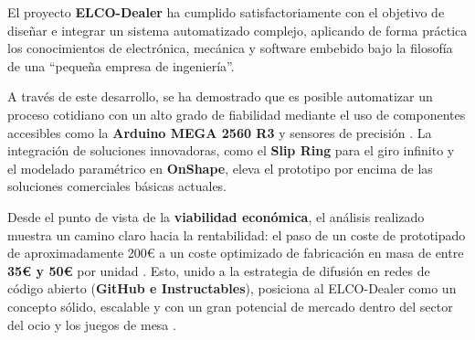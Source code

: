 El proyecto \textbf{ELCO-Dealer} ha cumplido satisfactoriamente con el objetivo de diseñar e integrar un sistema automatizado complejo, aplicando de forma práctica los conocimientos de electrónica, mecánica y software embebido bajo la filosofía de una ``pequeña empresa de ingeniería''.

A través de este desarrollo, se ha demostrado que es posible automatizar un proceso cotidiano con un alto grado de fiabilidad mediante el uso de componentes accesibles como la \textbf{Arduino MEGA 2560 R3} y sensores de precisión \cite{arduino_mega}. La integración de soluciones innovadoras, como el \textbf{Slip Ring} para el giro infinito y el modelado paramétrico en \textbf{OnShape}, eleva el prototipo por encima de las soluciones comerciales básicas actuales.

Desde el punto de vista de la \textbf{viabilidad económica}, el análisis realizado muestra un camino claro hacia la rentabilidad: el paso de un coste de prototipado de aproximadamente 200€ a un coste optimizado de fabricación en masa de entre \textbf{35€ y 50€} por unidad \cite{bom}. Esto, unido a la estrategia de difusión en redes de código abierto (\textbf{GitHub e Instructables}), posiciona al ELCO-Dealer como un concepto sólido, escalable y con un gran potencial de mercado dentro del sector del ocio y los juegos de mesa .